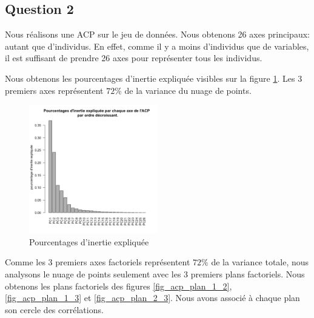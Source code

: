 \documentclass[a4paper,11pt,oneside,roman]{article}
\begin{document}
    \subsection*{Question 2}
    Nous réalisons une ACP sur le jeu de données. Nous obtenons 26 axes principaux: autant que d'individus.
    En effet, comme il y a moins d'individus que de variables, il est suffisant de prendre 26 axes pour représenter tous les individus.

    Nous obtenons les pourcentages d'inertie expliquée visibles sur la figure \ref{fig_acp}. 
    Les 3 premiers axes représentent $72\%$ de la variance du nuage de points.


    \begin{figure}
        \centering
        \includegraphics[width=0.5\textwidth]{imgs/acp.png}
        \caption{Pourcentages d'inertie expliquée}
        \label{fig_acp}
    \end{figure}

    Comme les 3 premiers axes factoriels représentent $72\%$ de la variance totale, nous analysons le nuage de points seulement avec les 3 premiers plans factoriels.
    Nous obtenons les plans factoriels des figures \ref{fig_acp_plan_1_2}, \ref{fig_acp_plan_1_3} et \ref{fig_acp_plan_2_3}. Nous avons associé à chaque plan son cercle des corrélations.
    
\end{document}
